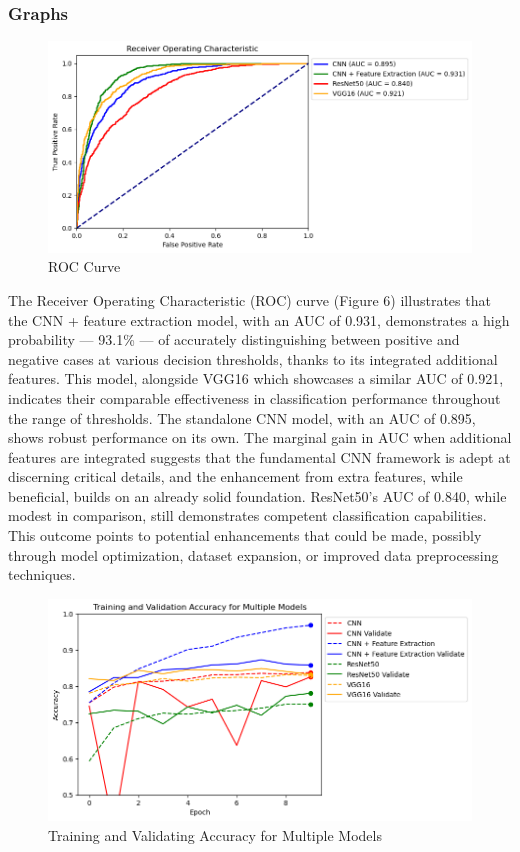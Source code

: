 \documentclass[10pt,twocolumn]{article}
\begin{document}
\subsubsection{Graphs}
\begin{figure}[h]
\caption{ROC Curve}
\includegraphics[scale=0.4]{ROC.png}\newline
\end{figure}
The Receiver Operating Characteristic (ROC) curve (Figure 6) illustrates that the CNN + feature extraction model, with an AUC of 0.931, demonstrates a high probability — 93.1\% — of accurately distinguishing between positive and negative cases at various decision thresholds, thanks to its integrated additional features. This model, alongside VGG16 which showcases a similar AUC of 0.921, indicates their comparable effectiveness in classification performance throughout the range of thresholds. \newline
The standalone CNN model, with an AUC of 0.895, shows robust performance on its own. The marginal gain in AUC when additional features are integrated suggests that the fundamental CNN framework is adept at discerning critical details, and the enhancement from extra features, while beneficial, builds on an already solid foundation. \newline
ResNet50's AUC of 0.840, while modest in comparison, still demonstrates competent classification capabilities. This outcome points to potential enhancements that could be made, possibly through model optimization, dataset expansion, or improved data preprocessing techniques.

\begin{figure}[h]
\caption{Training and Validating Accuracy for Multiple Models}
\includegraphics[scale=0.4]{AccuracyEpochs.png}\newline
\end{figure}
\end{document}
